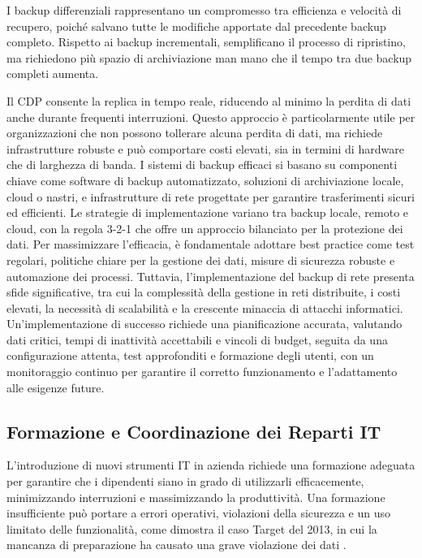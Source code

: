         I backup differenziali rappresentano un compromesso tra efficienza e velocità di recupero, poiché salvano tutte le modifiche apportate dal precedente backup completo. Rispetto ai backup incrementali, semplificano il processo di ripristino, ma richiedono più spazio di archiviazione man mano che il tempo tra due backup completi aumenta.
        
        Il CDP consente la replica in tempo reale, riducendo al minimo la perdita di dati anche durante frequenti interruzioni. Questo approccio è particolarmente utile per organizzazioni che non possono tollerare alcuna perdita di dati, ma richiede infrastrutture robuste e può comportare costi elevati, sia in termini di hardware che di larghezza di banda.
        I sistemi di backup efficaci si basano su componenti chiave come software di backup automatizzato, soluzioni di archiviazione locale, cloud o nastri, e infrastrutture di rete progettate per garantire trasferimenti sicuri ed efficienti. Le strategie di implementazione variano tra backup locale, remoto e cloud, con la regola 3-2-1 che offre un approccio bilanciato per la protezione dei dati. Per massimizzare l'efficacia, è fondamentale adottare best practice come test regolari, politiche chiare per la gestione dei dati, misure di sicurezza robuste e automazione dei processi. Tuttavia, l'implementazione del backup di rete presenta sfide significative, tra cui la complessità della gestione in reti distribuite, i costi elevati, la necessità di scalabilità e la crescente minaccia di attacchi informatici. Un'implementazione di successo richiede una pianificazione accurata, valutando dati critici, tempi di inattività accettabili e vincoli di budget, seguita da una configurazione attenta, test approfonditi e formazione degli utenti, con un monitoraggio continuo per garantire il corretto funzionamento e l'adattamento alle esigenze future.
        
    \subsection{Formazione e Coordinazione dei Reparti IT}
        L’introduzione di nuovi strumenti IT in azienda richiede una formazione adeguata per garantire che i dipendenti siano in grado di utilizzarli efficacemente, minimizzando interruzioni e massimizzando la produttività. Una formazione insufficiente può portare a errori operativi, violazioni della sicurezza e un uso limitato delle funzionalità, come dimostra il caso Target del 2013, in cui la mancanza di preparazione ha causato una grave violazione dei dati \cite{target_2013_breach}.

